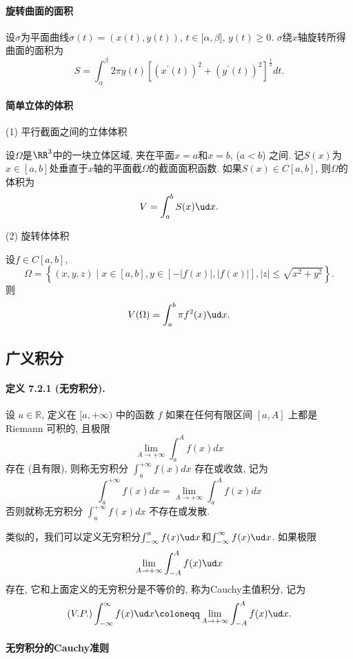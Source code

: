 \paragraph{旋转曲面的面积}

设$\sigma$为平面曲线$\sigma(t)=(x(t),y(t))$, $t\in[\alpha,\beta${]},
$y(t)\ge0$. $\sigma$绕$x$轴旋转所得曲面的面积为
\[
S=\int_{\alpha}^{\beta}2\pi y(t)\left[\left(x^{\prime}(t)\right)^{2}+\left(y^{\prime}(t)\right)^{2}\right]^{\frac{1}{2}}dt.
\]


\paragraph{简单立体的体积}

(1) 平行截面之间的立体体积

设$\Omega$是$\RR^{3}$中的一块立体区域, 夹在平面$x=a$和$x=b$, ($a<b$) 之间. 记$S(x)$为$x\in[a,b]$处垂直于$x$轴的平面截$\Omega$的截面面积函数.
如果$S(x)\in C[a,b]$, 则$\Omega$的体积为
\[
V=\int_{a}^{b}S(x)\ud x.
\]

(2) 旋转体体积

设$f\in C[a,b]$, 
\[
\Omega=\left\{ (x,y,z)\mid x\in[a,b],y\in[-\left|f(x)\right|,\left|f(x)\right|],\left|z\right|\le\sqrt{x^{2}+y^{2}}\right\} .
\]
则
\[
V(\Omega)=\int_{a}^{b}\pi f^{2}(x)\ud x.
\]


\subsection{广义积分}

\paragraph{定义 7.2.1 (无穷积分). }

设 $a\in\mathbb{R}$, 定义在 $[a,+\infty)$ 中的函数 $f$ 如果在任何有限区间 $[a,A]$
上都是 Riemann 可积的, 且极限 
\[
\lim_{A\rightarrow+\infty}\int_{a}^{A}f(x)dx
\]
存在 (且有限), 则称无穷积分 $\int_{a}^{+\infty}f(x)dx$ 存在或收敛, 记为 
\[
\int_{a}^{+\infty}f(x)dx=\lim_{A\rightarrow+\infty}\int_{a}^{A}f(x)dx
\]
否则就称无穷积分 $\int_{a}^{+\infty}f(x)dx$ 不存在或发散.

类似的，我们可以定义无穷积分$\int_{-\infty}^{a}f(x)\ud x$和$\int_{-\infty}^{\infty}f(x)\ud x$.
如果极限
\[
\lim_{A\to+\infty}\int_{-A}^{A}f(x)\ud x
\]
存在, 它和上面定义的无穷积分是不等价的, 称为Cauchy主值积分, 记为
\[
(V.P.)\int_{-\infty}^{\infty}f(x)\ud x\coloneqq\lim_{A\to+\infty}\int_{-A}^{A}f(x)\ud x.
\]


\paragraph{无穷积分的Cauchy准则}

